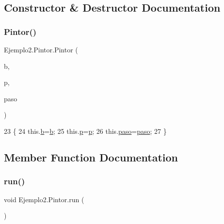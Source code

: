 \subsection{Constructor \& Destructor Documentation}
\mbox{\label{class_ejemplo2_1_1_pintor_a2b7757077832db106287bdd5cd27f89f}} 
\subsubsection{\texorpdfstring{Pintor()}{Pintor()}}
{\footnotesize\ttfamily Ejemplo2.\+Pintor.\+Pintor (\begin{DoxyParamCaption}\item[{J\+Button}]{b,  }\item[{\mbox{\hyperlink{class_ejemplo2_1_1_paleta}{Paleta}}}]{p,  }\item[{\mbox{\hyperlink{class_ejemplo2_1_1_paso}{Paso}}}]{paso }\end{DoxyParamCaption})\hspace{0.3cm}{\ttfamily [inline]}}


\begin{DoxyCode}
23     \{
24         this.\mbox{\hyperlink{class_ejemplo2_1_1_pintor_a6021262faf6f2f448fae53f631925af4}{b}}=\mbox{\hyperlink{class_ejemplo2_1_1_pintor_a6021262faf6f2f448fae53f631925af4}{b}};
25         this.\mbox{\hyperlink{class_ejemplo2_1_1_pintor_af9c943ecf491a9a812b1df951af13bf3}{p}}=\mbox{\hyperlink{class_ejemplo2_1_1_pintor_af9c943ecf491a9a812b1df951af13bf3}{p}};
26         this.\mbox{\hyperlink{class_ejemplo2_1_1_pintor_aa876f4590a419d58d81a29fcbf2a7529}{paso}}=\mbox{\hyperlink{class_ejemplo2_1_1_pintor_aa876f4590a419d58d81a29fcbf2a7529}{paso}};
27     \}
\end{DoxyCode}


\subsection{Member Function Documentation}
\mbox{\label{class_ejemplo2_1_1_pintor_a9d8a7b2851801f1613795f4848be48b3}} 
\subsubsection{\texorpdfstring{run()}{run()}}
{\footnotesize\ttfamily void Ejemplo2.\+Pintor.\+run (\begin{DoxyParamCaption}{ }\end{DoxyParamCaption})\hspace{0.3cm}{\ttfamily [inline]}}


